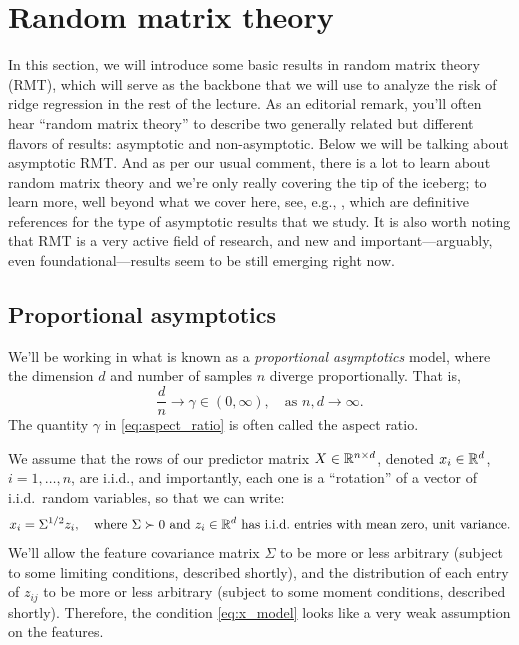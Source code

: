 \documentclass{article}
\begin{document}
\section{Random matrix theory}

In this section, we will introduce some basic results in random matrix theory
(RMT), which will serve as the backbone that we will use to analyze the risk of
ridge regression in the rest of the lecture. As an editorial remark, you'll
often hear ``random matrix theory'' to describe two generally related but
different flavors of results: asymptotic and non-asymptotic. Below we will be
talking about asymptotic RMT. And as per our usual comment, there is a lot to 
learn about random matrix theory and we're only really covering the tip of the
iceberg; to learn more, well beyond what we cover here, see, e.g.,
\citet{tulino2004random, bai2010spectral}, which are definitive references for
the type of asymptotic results that we study. It is also worth noting that RMT
is a very active field of research, and new and important---arguably, even
foundational---results seem to be still emerging right now.   

\subsection{Proportional asymptotics}

We'll be working in what is known as a \emph{proportional asymptotics} model,
where the dimension $d$ and number of samples $n$ diverge proportionally. That 
is,
\begin{equation}
\label{eq:aspect_ratio}
\frac{d}{n} \to \gamma \in (0,\infty), \quad \text{as $n,d \to \infty$}. 
\end{equation}
The quantity $\gamma$ in \eqref{eq:aspect_ratio} is often called the aspect
ratio.

We assume that the rows of our predictor matrix $X \in \mathbb{R}^{n \times d}$, denoted 
$x_i \in \mathbb{R}^d$, $i=1,\dots,n$, are i.i.d., and importantly, each one is a
``rotation'' of a vector of i.i.d.\ random variables, so that we can write:   
\begin{equation}
\label{eq:x_model}
x_i = \Sigma^{1/2} z_i, \quad \text{where $\Sigma \succ 0$ and $z_i \in \mathbb{R}^d$
  has i.i.d.\ entries with mean zero, unit variance.}
\end{equation}
We'll allow the feature covariance matrix $\Sigma$ to be more or less arbitrary 
(subject to some limiting conditions, described shortly), and the distribution
of each entry of $z_{ij}$ to be more or less arbitrary (subject to some moment
conditions, described shortly). Therefore, the condition \eqref{eq:x_model}
looks like a very weak assumption on the features.  
\end{document}
